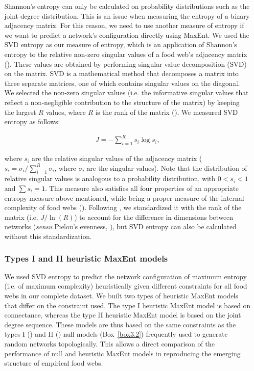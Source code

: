 Shannon's entropy can only be calculated on probability distributions such as
the joint degree distribution. This is an issue when measuring the entropy of a
binary adjacency matrix. For this reason, we need to use another measure of
entropy if we want to predict a network's configuration directly using MaxEnt.
We used the SVD entropy as our measure of entropy, which is an application of
Shannon's entropy to the relative non-zero singular values of a food web's
adjacency matrix (\cite{Strydom2021Svd}). These values are obtained by
performing singular value decomposition (SVD) on the matrix. SVD is a
mathematical method that decomposes a matrix into three separate matrices, one
of which contains singular values on the diagonal. We selected the non-zero
singular values (i.e. the informative singular values that reflect a
non-negligible contribution to the structure of the matrix) by keeping the
largest $R$ values, where $R$ is the rank of the matrix
(\cite{Golub1987Generalization}). We measured SVD entropy as follows: 

\begin{eqnarray}
\label{eq:svd-entropy}
       J = -\sum_{i=1}^R s_i \log s_i,
\end{eqnarray}

where $s_i$ are the relative singular values of the adjacency matrix ($s_i =
\sigma_i / \sum_{i = 1}^R \sigma_i$, where $\sigma_i$ are the singular values).
Note that the distribution of relative singular values is analogous to a
probability distribution, with $0 < s_i < 1$ and $\sum s_i = 1$. This measure
also satisfies all four properties of an appropriate entropy measure
above-mentioned, while being a proper measure of the internal complexity of food
webs (\cite{Strydom2021Svd}). Following \textcite{Strydom2021Svd}, we
standardized it with the rank of the matrix (i.e. $J / \ln(R)$) to account for
the difference in dimensions between networks (\textit{sensu} Pielou's evenness,
\cite{Pielou1975Ecological}), but SVD entropy can also be calculated without this
standardization.

\subsubsection{Types I and II heuristic MaxEnt models}

We used SVD entropy to predict the network configuration of maximum entropy
(i.e. of maximum complexity) heuristically given different constraints for all
food webs in our complete dataset. We built two types of heuristic MaxEnt models
that differ on the constraint used. The type I heuristic MaxEnt model is based
on connectance, whereas the type II heuristic MaxEnt model is based on the joint
degree sequence. These models are thus based on the same constraints as the
types I (\cite{Fortuna2006Habitat}) and II (\cite{Bascompte2003Nested}) null
models (Box~\ref{box3.2}) frequently used to generate random networks
topologically. This allows a direct comparison of the performance of null and
heuristic MaxEnt models in reproducing the emerging structure of empirical food
webs. 

